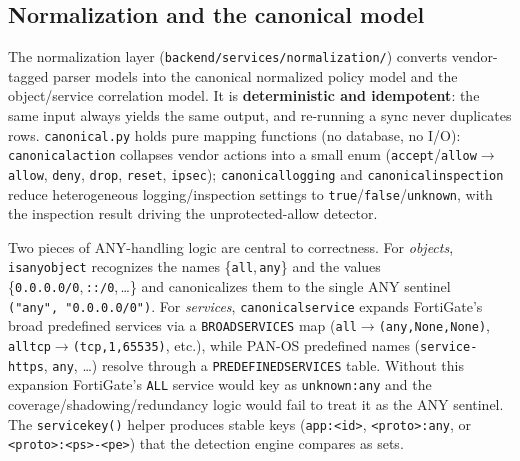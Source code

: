 \documentclass[12pt,a4paper]{report}
\renewcommand{\_}{\textunderscore\allowbreak}
\begin{document}
\subsection*{Normalization and the canonical model}

The normalization layer (\texttt{backend/services/normalization/}) converts vendor-tagged parser models into the canonical normalized policy model and the object/service correlation model. It is \textbf{deterministic and idempotent}: the same input always yields the same output, and re-running a sync never duplicates rows. \texttt{canonical.py} holds pure mapping functions (no database, no I/O): \texttt{canonical\_action} collapses vendor actions into a small enum (\texttt{accept}/\texttt{allow}$\rightarrow$\texttt{allow}, \texttt{deny}, \texttt{drop}, \texttt{reset}, \texttt{ipsec}); \texttt{canonical\_logging} and \texttt{canonical\_inspection} reduce heterogeneous logging/inspection settings to \texttt{true}/\texttt{false}/\texttt{unknown}, with the inspection result driving the unprotected-allow detector.

Two pieces of ANY-handling logic are central to correctness. For \emph{objects}, \texttt{is\_any\_object} recognizes the names \{\texttt{all},\,\texttt{any}\} and the values \{\texttt{0.0.0.0/0},\,\texttt{::/0},\,\dots\} and canonicalizes them to the single ANY sentinel \texttt{("any",\,"0.0.0.0/0")}. For \emph{services}, \texttt{canonical\_service} expands FortiGate's broad predefined services via a \texttt{\_BROAD\_SERVICES} map (\texttt{all}$\rightarrow$\texttt{(any,None,None)}, \texttt{all\_tcp}$\rightarrow$\texttt{(tcp,1,65535)}, etc.), while PAN-OS predefined names (\texttt{service-https}, \texttt{any}, \dots) resolve through a \texttt{PREDEFINED\_SERVICES} table. Without this expansion FortiGate's \texttt{ALL} service would key as \texttt{unknown:any} and the coverage/shadowing/redundancy logic would fail to treat it as the ANY sentinel. The \texttt{service\_key()} helper produces stable keys (\texttt{app:<id>}, \texttt{<proto>:any}, or \texttt{<proto>:<ps>-<pe>}) that the detection engine compares as sets.
\end{document}
